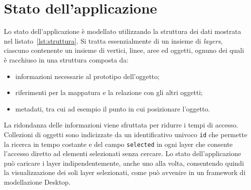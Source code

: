 \section{Stato dell'applicazione}
\label{sec:chapter_2_section_4}

Lo stato dell'applicazione è modellato utilizzando la struttura dei dati mostrata nel listato~\ref{lst:struttura}.
Si tratta essenzialmente di un insieme di \emph{layers}, ciascuno contenente un insieme di vertici, linee, aree
ed oggetti, ognuno dei quali è racchiuso in una struttura composta da:
\begin{itemize}
\item informazioni necessarie al prototipo dell'oggetto;
\item riferimenti per la mappatura e la relazione con gli altri oggetti;
\item metadati, tra cui ad esempio il punto in cui posizionare l'oggetto.
\end{itemize}

La ridondanza delle informazioni viene sfruttata per ridurre i tempi di accesso. Collezioni di oggetti
sono indicizzate da un identificativo univoco \texttt{id} che permette la ricerca in tempo costante e del
campo \texttt{selected} in ogni layer che consente l'accesso diretto ad elementi selezionati senza cercare.
Lo stato dell'applicazione può caricare i layer indipendentemente, anche uno alla volta, consentendo quindi
la visualizzazione dei soli layer selezionati, come può avvenire in un framework di modellazione Desktop.\\

\newpage



